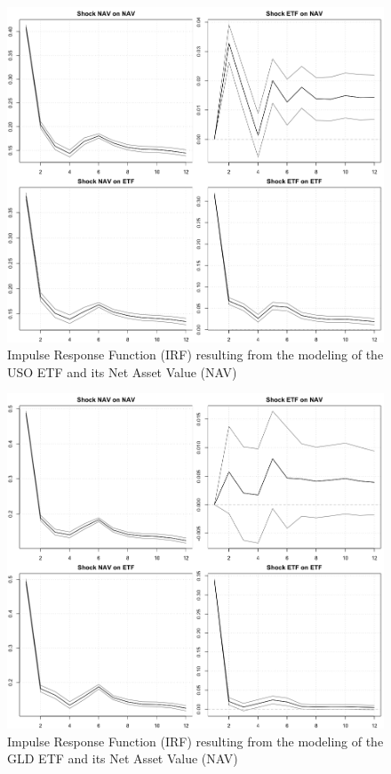 \begin{landscape}
\begin{figure}[t]
\includegraphics[width=16cm]{USO_irf.png}
\centering
\caption{Impulse Response Function (IRF) resulting from the modeling of the USO ETF and its Net Asset Value (NAV)}
\label{fig:irf1}
\end{figure}
\end{landscape}

\begin{landscape}
\begin{figure}[t]
\includegraphics[width=16cm]{GLD_irf.png}
\centering
\caption{Impulse Response Function (IRF) resulting from the modeling of the GLD ETF and its Net Asset Value (NAV)}
\label{fig:irf2}
\end{figure}
\end{landscape}

